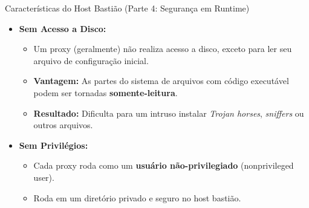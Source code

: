 \begin{frame}{Características do Host Bastião (Parte 4: Segurança em Runtime)}
    \begin{itemize}
        \item \textbf{Sem Acesso a Disco:}
              \begin{itemize}
                  \item Um proxy (geralmente) não realiza acesso a disco, exceto para ler seu arquivo de configuração inicial.
                  \item \textbf{Vantagem:} As partes do sistema de arquivos com código executável podem ser tornadas \textbf{somente-leitura}.
                  \item \textbf{Resultado:} Dificulta para um intruso instalar \textit{Trojan horses}, \textit{sniffers} ou outros arquivos.
              \end{itemize}

        \item \textbf{Sem Privilégios:}
              \begin{itemize}
                  \item Cada proxy roda como um \textbf{usuário não-privilegiado} (nonprivileged user).
                  \item Roda em um diretório privado e seguro no host bastião.
              \end{itemize}
    \end{itemize}
\end{frame}

